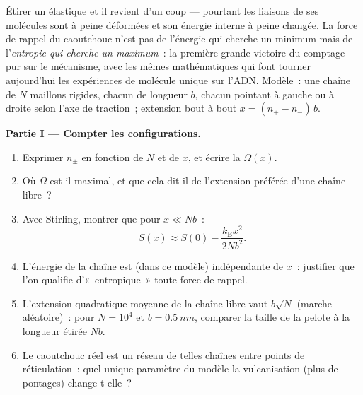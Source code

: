 \begin{problem}\label{pb:b3:microcanonical-ensemble:1}
Étirer un élastique et il revient d'un coup --- pourtant les liaisons
de ses molécules sont à peine déformées et son énergie interne à peine
changée. La force de rappel du caoutchouc n'est pas de l'énergie qui
cherche un minimum mais de l'\emph{entropie qui cherche un maximum}~:
la première grande victoire du comptage pur sur le mécanisme, avec les
mêmes mathématiques qui font tourner aujourd'hui les expériences de
molécule unique sur l'ADN. Modèle~: une chaîne de $N$ maillons
rigides, chacun de longueur $b$, chacun pointant à gauche ou à droite
selon l'axe de traction~; extension bout à bout $x = (n_+ - n_-)\,b$.

\medskip\noindent\textbf{Partie I --- Compter les configurations.}
\begin{enumerate}
  \item Exprimer $n_\pm$ en fonction de $N$ et de $x$, et écrire la
         $\Omega(x)$.
  \item Où $\Omega$ est-il maximal, et que cela dit-il de l'extension
        préférée d'une chaîne libre~?
  \item Avec Stirling, montrer que pour $x \ll Nb$~:
        \[
        S(x) \approx S(0) - \frac{k_{\text{B}}x^2}{2Nb^2} .
        \]
  \item L'énergie de la chaîne est (dans ce modèle) indépendante de
        $x$~: justifier que l'on qualifie d'«~entropique~» toute force
        de rappel.
  \item L'extension quadratique moyenne de la chaîne libre vaut
        $b\sqrt N$ (marche aléatoire)~: pour $N = 10^4$ et
        $b = \qty{0.5}{nm}$, comparer la taille de la pelote à la
        longueur étirée $Nb$.
  \item Le caoutchouc réel est un réseau de telles chaînes entre
        points de réticulation~: quel unique paramètre du modèle la
        vulcanisation (plus de pontages) change-t-elle~?
\end{enumerate}


\end{problem}
